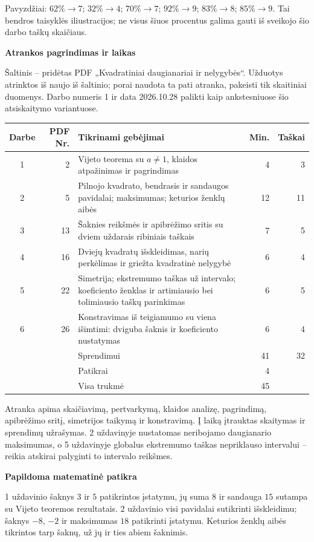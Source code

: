 \documentclass[11pt]{article}
\newcommand{\sk}[1]{\par\medskip\textbf{#1}\par}
\begin{document}
Pavyzdžiai: $62\%\to7$; $32\%\to4$; $70\%\to7$; $92\%\to9$; $83\%\to8$; $85\%\to9$. Tai bendros taisyklės iliustracijos; ne visus šiuos procentus galima gauti iš sveikojo šio darbo taškų skaičiaus.
\newpage

\sk{Atrankos pagrindimas ir laikas}
Šaltinis -- pridėtas PDF „Kvadratiniai daugianariai ir nelygybės“. Užduotys atrinktos iš naujo iš šaltinio; porai naudota ta pati atranka, pakeisti tik skaitiniai duomenys. Darbo numeris 1 ir data 2026.10.28 palikti kaip ankstesniuose šio atsiskaitymo variantuose.
\begin{center}\renewcommand{\arraystretch}{1.25}
\begin{tabularx}{\linewidth}{@{}crXrr@{}}\toprule
Darbe & PDF Nr. & Tikrinami gebėjimai & Min. & Taškai\\\midrule
1 & 2 & Vijeto teorema su $a\ne1$, klaidos atpažinimas ir pagrindimas & 4 & 3\\
2 & 5 & Pilnojo kvadrato, bendrasis ir sandaugos pavidalai; maksimumas; keturios ženklų aibės & 12 & 11\\
3 & 13 & Šaknies reikšmės ir apibrėžimo sritis su dviem uždarais ribiniais taškais & 7 & 5\\
4 & 16 & Dviejų kvadratų išskleidimas, narių perkėlimas ir griežta kvadratinė nelygybė & 6 & 4\\
5 & 22 & Simetrija; ekstremumo taškas už intervalo; koeficiento ženklas ir artimiausio bei tolimiausio taškų parinkimas & 6 & 5\\
6 & 26 & Konstravimas iš teigiamumo su viena išimtimi: dviguba šaknis ir koeficiento nustatymas & 6 & 4\\\midrule
 & & Sprendimui & 41 & 32\\
 & & Patikrai & 4 & \\
 & & Visa trukmė & 45 & \\\bottomrule
\end{tabularx}\end{center}
Atranka apima skaičiavimą, pertvarkymą, klaidos analizę, pagrindimą, apibrėžimo sritį, simetrijos taikymą ir konstravimą. Į laiką įtrauktas skaitymas ir sprendimų užrašymas. 2 uždavinyje nustatomas neribojamo daugianario maksimumas, o 5 uždavinyje globalus ekstremumo taškas nepriklauso intervalui -- reikia atskirai palyginti to intervalo reikšmes.

\sk{Papildoma matematinė patikra}
1 uždavinio šaknys $3$ ir $5$ patikrintos įstatymu, jų suma $8$ ir sandauga $15$ sutampa su Vijeto teoremos rezultatais. 2 uždavinio visi pavidalai sutikrinti išskleidimu; šaknys $-8$, $-2$ ir maksimumas $18$ patikrinti įstatymu. Keturios ženklų aibės tikrintos tarp šaknų, už jų ir ties abiem šaknimis.
\end{document}
